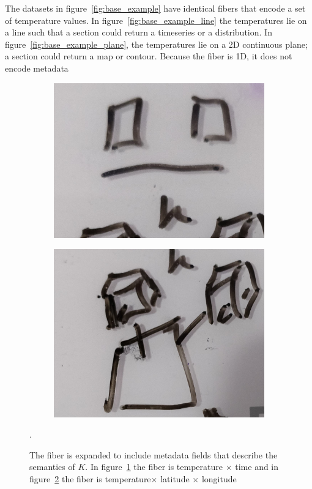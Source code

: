 \documentclass[../main.tex]{subfiles}
\begin{document}
The datasets in figure~\ref{fig:base_example} have identical fibers that encode a set of temperature values. In figure~\ref{fig:base_example_line} the temperatures lie on a line such that a section could return a timeseries or a distribution. In figure~\ref{fig:base_example_plane}, the temperatures lie on a 2D continuous plane; a section could return a map or contour. Because the fiber is 1D, it does not encode metadata 

\begin{figure}[ht!]
    \begin{subfigure}{.5\textwidth}
        \includegraphics[width=\textwidth]{figures/math/temp_2f.png}
        \label{fig:fiber_example_plane}
    \end{subfigure}
    \begin{subfigure}{.5\textwidth}
        \includegraphics[width=\textwidth]{figures/math/temp_3f.png}
        \label{fig:fiber_example_cube}
    \end{subfigure}
    \label{fig:fiber_example}
    \caption{The fiber is expanded to include metadata fields that describe the semantics of $K$. In figure~\ref{fig:fiber_example_plane} the fiber is \textrm{temperature} $\times$ \textrm{time} and in figure~\ref{fig:fiber_example_cube} the fiber is \textrm{temperature}$\times$ \textrm{latitude} $\times$ {longitude}}.
\end{figure}
\end{document}
